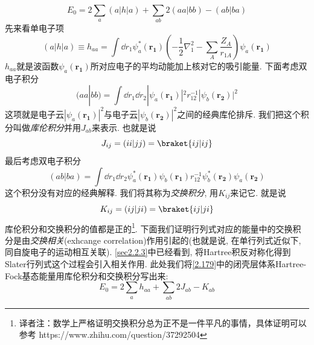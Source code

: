 \begin{equation}
\label{2.179}
E_0 = 2 \sum_{a}(a|h|a) + \sum_{ab}2(aa|bb) - (ab|ba)
\end{equation}
先来看单电子项
\begin{equation}
(a|h|a) \equiv h_{aa} = \int\dd{r_1}\psi_a^*(\mathbf{r_1})\left( -\frac{1}{2}\nabla_1^2 - \sum_A\frac{Z_A}{r_{1A}} \right)\psi_a(\mathbf{r_1})
\end{equation}
$h_{aa}$就是波函数$\psi_a(\mathbf{r_1})$所对应电子的平均动能加上核对它的吸引能量. 下面考虑双电子积分
\begin{equation}
(aa|bb) = \int\dd{r_1}\dd{r_2}|\psi_a(\mathbf{r_1})|^2r_{12}^{-1}|\psi_b(\mathbf{r_2})|^2
\end{equation}
这项就是电子云$|\psi_a(\mathbf{r_1})|^2$与电子云$|\psi_b(\mathbf{r_2})|^2$之间的经典库伦排斥. 
我们把这个积分叫做\emph{库伦积分}并用$J_{ab}$来表示. 
也就是说
\begin{equation}
J_{ij} = (ii|jj) = \braket{ij|ij}
\end{equation} 
最后考虑双电子积分
\begin{equation}
(ab|ba) = \int\dd{r_1}\dd{r_2} \psi_a^*(\mathbf{r_1})\psi_b(\mathbf{r_1}) r_{12}^{-1} \psi_b^*(\mathbf{r_2}) \psi_a(\mathbf{r_2})
\end{equation}
这个积分没有对应的经典解释. 
我们将其称为\emph{交换积分}, 
用$K_{ij}$来记它. 
就是说
\begin{equation}
K_{ij} = (ij|ji) = \braket{ij|ji}
\end{equation}
库伦积分和交换积分的值都是正的\footnote{译者注：数学上严格证明交换积分总为正不是一件平凡的事情，具体证明可以参考 https://www.zhihu.com/question/37292504}. 
下面我们证明行列式对应的能量中的交换积分是由\emph{交换相关}(exhcange correlation)作用引起的(也就是说,
在单行列式近似下, 
同自旋电子的运动相互关联). 
\autoref{sec2.2.3}中已经看到, 
将Hartree积反对称化得到Slater行列式这个过程会引入相关作用. 
此处我们将\autoref{2.179}中的闭壳层体系Hartree-Fock基态能量用库伦积分和交换积分写出来:
\begin{equation}
E_0 = 2\sum_a h_{aa} + \sum_{ab}2J_{ab} - K_{ab} 
\end{equation}

